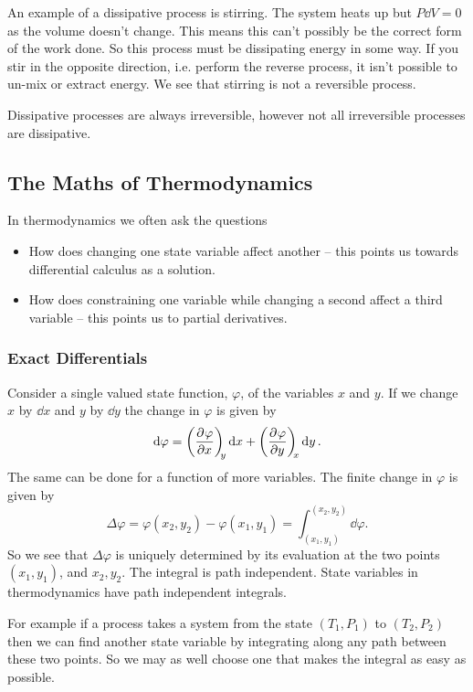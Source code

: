 \documentclass[a4paper]{article}
\begin{document}
    An example of a dissipative process is stirring.
    The system heats up but \(P\dd{V} = 0\) as the volume doesn't change.
    This means this can't possibly be the correct form of the work done.
    So this process must be dissipating energy in some way.
    If you stir in the opposite direction, i.e. perform the reverse process, it isn't possible to un-mix or extract energy.
    We see that stirring is not a reversible process.
    
    Dissipative processes are always irreversible, however not all irreversible processes are dissipative.
    
    \subsection{The Maths of Thermodynamics}
    In thermodynamics we often ask the questions
    \begin{itemize}
        \item How does changing one state variable affect another -- this points us towards differential calculus as a solution.
        \item How does constraining one variable while changing a second affect a third variable -- this points us to partial derivatives.
    \end{itemize}
    
    \subsubsection{Exact Differentials}
    Consider a single valued state function, \(\varphi\), of the variables \(x\) and \(y\).
    If we change \(x\) by \(\dd{x}\) and \(y\) by \(\dd{y}\) the change in \(\varphi\) is given by
    \[\dd{\varphi} = \left(\pdv[]{\varphi}{x}\right)_{\!\!{y}}\dd{x} + \left(\pdv[]{\varphi}{y}\right)_{\!\!{x}}\dd{y}.\]
    The same can be done for a function of more variables.
    The finite change in \(\varphi\) is given by
    \[\Delta\varphi = \varphi(x_2, y_2) - \varphi(x_1, y_1) = \int_{(x_1, y_1)}^{(x_2, y_2)} \dd{\varphi}.\]
    So we see that \(\Delta\varphi\) is uniquely determined by its evaluation at the two points \((x_1, y_1)\), and \(x_2, y_2\).
    The integral is path independent.
    State variables in thermodynamics have path independent integrals.
    
    For example if a process takes a system from the state \((T_1, P_1)\) to \((T_2, P_2)\) then we can find another state variable by integrating along any path between these two points.
    So we may as well choose one that makes the integral as easy as possible.
    
\end{document}
